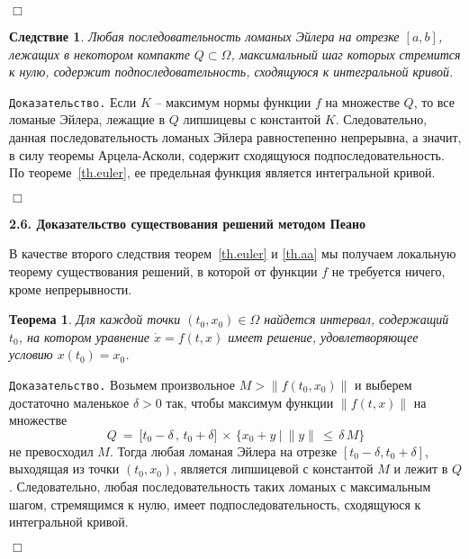 \documentclass[12pt,a4paper]{article}
\newtheorem{theorem}{Теорема}
\newtheorem{cor}{Следствие}
\begin{document}
   {\hfill $\Box$}
\medskip

\begin{cor}\label{c.euler-aa}
Любая последовательность ломаных Эйлера на отрезке $[a, b]$,
лежащих в некотором компакте $Q \subset \Omega$, максимальный шаг которых
стремится к нулю, содержит подпоследовательность, сходящуюся к интегральной кривой.
\end{cor}
{\tt Доказательство.} Если $K$ -- максимум нормы функции $f$ на множестве $Q$, то
все ломаные Эйлера, лежащие в $Q$ липшицевы с константой  $K$. Следовательно, данная последовательность
ломаных Эйлера равностепенно непрерывна, а значит, в силу теоремы Арцела-Асколи, содержит сходящуюся подпоследовательность. По теореме~\ref{th.euler}, ее предельная функция является интегральной кривой.

   {\hfill $\Box$}
\medskip

\begin{center}
\textbf{2.6. Доказательство существования решений методом Пеано}
\end{center}
\medskip

В качестве второго следствия теорем~\ref{th.euler} и \ref{th.aa} мы получаем локальную теорему существования решений,
в которой от функции $f$ не требуется ничего, кроме непрерывности.
\begin{theorem}\label{th.exist}
Для каждой точки $(t_0, x_0) \in \Omega$ найдется
интервал, содержащий $t_0$, на котором уравнение $\dot x = f(t, x)$ имеет решение,
 удовлетворяющее условию $x(t_0) = x_0$.
\end{theorem}
{\tt Доказательство.} Возьмем произвольное $M > \|f(t_0, x_0)\|$ и выберем 
 достаточно маленькое $\delta > 0$ так, чтобы
максимум функции $\|f(t, x)\|$ на множестве
$$
Q \ = \ \bigl[t_0 - \delta\, , \, t_0 + \delta \bigr]\, \times \, 
\bigl\{x_0 + y \ | \ \|y\| \, \le \, \delta\, M \bigr\}
$$
не превосходил $M$. Тогда любая ломаная Эйлера на отрезке $[t_0 - \delta, t_0 + \delta]$, выходящая из точки   $(t_0, x_0)$, является липшицевой с константой $M$ и лежит в $Q$. Следовательно, любая последовательность таких ломаных с максимальным шагом, стремящимся к нулю, имеет подпоследовательность, сходящуюся к интегральной кривой.

   {\hfill $\Box$}
\medskip
\end{document}
